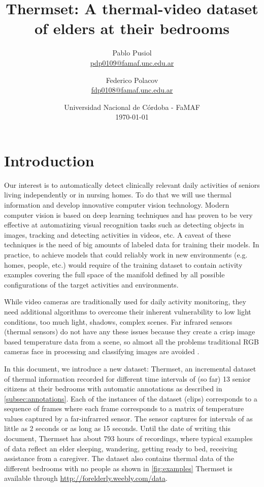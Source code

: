 \documentclass[oneside, twocolumn]{article}
\title{\LARGE Thermset: A thermal-video dataset of elders at their bedrooms} %
\author{Pablo Pusiol\\ \href{mailto:pdp0109@famaf.unc.edu.ar \qquad Pablo Pusiol }{pdp0109@famaf.unc.edu.ar} \and Federico Polacov \\\href{mailto:fdp0108@famaf.unc.edu.ar}{fdp0108@famaf.unc.edu.ar}}
\date{Universidad Nacional de C\'ordoba - FaMAF \\ \today}
\newcommand\TotalHoursOfRecording{793}
\newcommand\NumberOfPeople{13}
\begin{document}
\maketitle


\section{Introduction}
\label{sec:introduction}
Our interest is to automatically detect clinically relevant daily activities of seniors living independently
or in nursing homes. To do that we will use thermal information and develop innovative computer vision technology.
Modern computer vision is based on deep learning techniques and has proven to be very effective at automatizing
visual recognition tasks such as detecting objects in images, tracking and detecting activities in videos, etc.
A caveat of these techniques is the need of big amounts of labeled data for training their models. In practice,
to achieve  models that could reliably work in new  environments (e.g. homes, people, etc.) would require of the
training dataset to contain activity examples covering the full space of the manifold defined by all possible
configurations of the target activities and environments.

While video cameras are traditionally used for daily activity monitoring, they need additional algorithms to
overcome their inherent vulnerability to low light conditions, too much light, shadows, complex scenes. Far
infrared sensors (thermal sensors) do not have any these issues because they create a crisp image based temperature
data from a scene, so almost all the problems traditional RGB cameras face in processing and classifying images are
avoided \cite{chengl}.

In this document, we introduce a new dataset: Thermset, an incremental dataset of thermal information recorded
for different time intervals of (so far) \NumberOfPeople{} senior citizens at their bedrooms with automatic
annotations as described in \autoref{subsec:annotations}. Each of the instances of the dataset (clips) corresponds
 to a sequence of frames where each frame corresponds to a matrix of temperature values captured by a
 far-infrarred sensor. The sensor captures for intervals of as little as 2 seconds or as long as 15 seconds. Until
 the date of writing this document, Thermset has about \TotalHoursOfRecording{} hours of recordings, where typical
 examples of data reflect an elder sleeping, wandering, getting ready to bed, receiving assistance from a caregiver.
 The dataset also contains thermal data of the different bedrooms with no people as shown in \autoref{fig:examples}
 Thermset is available through \url{http://forelderly.weebly.com/data}.
\end{document}
